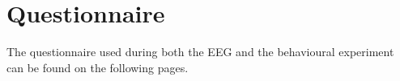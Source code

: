 \chapter{Questionnaire}\label{appendix:questionnaire}

The questionnaire used during both the EEG and the behavioural experiment can be found on the following pages.

